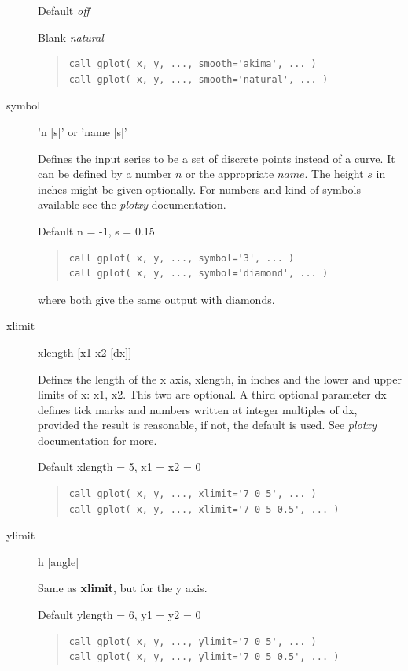 \documentclass{article}
\begin{document}
\begin{description}
Default {\it off}

Blank {\it natural}

\begin{quote}
\begin{verbatim}
call gplot( x, y, ..., smooth='akima', ... )
call gplot( x, y, ..., smooth='natural', ... )
\end{verbatim}
\end{quote}

\item[symbol] 'n [s]' or 'name [s]'

Defines the input series to be a set of discrete points instead of a curve. It can be defined by a number $n$ or the appropriate $name$. The height $s$ in inches might be given optionally. For numbers and kind of symbols available see the {\it plotxy} documentation. 

Default n = -1, s = 0.15
\begin{quote}
\begin{verbatim}
call gplot( x, y, ..., symbol='3', ... )
call gplot( x, y, ..., symbol='diamond', ... )
\end{verbatim}
\end{quote}
where both give the same output with diamonds. 

\item[xlimit] xlength [x1 x2 [dx]]

Defines the length of the x axis, xlength, in inches and the lower and upper limits of x: x1, x2. This two are optional. A third optional parameter dx defines tick marks and numbers written at integer multiples of dx, provided the result is reasonable, if not, the default is used. See {\it plotxy} documentation for more.

Default xlength = 5, x1 = x2 = 0

\begin{quote}
\begin{verbatim}
call gplot( x, y, ..., xlimit='7 0 5', ... )
call gplot( x, y, ..., xlimit='7 0 5 0.5', ... )
\end{verbatim}
\end{quote}

\item[ylimit] h [angle]

Same as \textbf{xlimit}, but for the y axis. 

Default ylength = 6, y1 = y2 = 0

\begin{quote}
\begin{verbatim}
call gplot( x, y, ..., ylimit='7 0 5', ... )
call gplot( x, y, ..., ylimit='7 0 5 0.5', ... )
\end{verbatim}
\end{quote}


\end{description}
\end{document}
